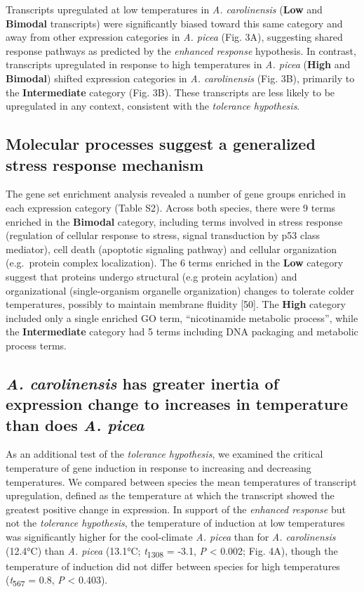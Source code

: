 \documentclass[]{article}
\begin{document}
Transcripts upregulated at low temperatures in \emph{A. carolinensis}
(\textbf{Low} and \textbf{Bimodal} transcripts) were significantly
biased toward this same category and away from other expression
categories in \emph{A. picea} (Fig. 3A), suggesting shared response
pathways as predicted by the \emph{enhanced response} hypothesis. In
contrast, transcripts upregulated in response to high temperatures in
\emph{A. picea} (\textbf{High} and \textbf{Bimodal}) shifted expression
categories in \emph{A. carolinensis} (Fig. 3B), primarily to the
\textbf{Intermediate} category (Fig. 3B). These transcripts are less
likely to be upregulated in any context, consistent with the
\emph{tolerance hypothesis}.

\subsection{Molecular processes suggest a generalized stress response
mechanism}\label{molecular-processes-suggest-a-generalized-stress-response-mechanism}

The gene set enrichment analysis revealed a number of gene groups
enriched in each expression category (Table S2). Across both species,
there were 9 terms enriched in the \textbf{Bimodal} category, including
terms involved in stress response (regulation of cellular response to
stress, signal transduction by p53 class mediator), cell death
(apoptotic signaling pathway) and cellular organization (e.g.~protein
complex localization). The 6 terms enriched in the \textbf{Low} category
suggest that proteins undergo structural (e.g protein acylation) and
organizational (single-organism organelle organization) changes to
tolerate colder temperatures, possibly to maintain membrane fluidity
{[}50{]}. The \textbf{High} category included only a single enriched GO
term, ``nicotinamide metabolic process'', while the
\textbf{Intermediate} category had 5 terms including DNA packaging and
metabolic process terms.

\subsection{\emph{A. carolinensis} has greater inertia of expression
change to increases in temperature than does \emph{A.
picea}}\label{a.-carolinensis-has-greater-inertia-of-expression-change-to-increases-in-temperature-than-does-a.-picea}

As an additional test of the \emph{tolerance hypothesis}, we examined
the critical temperature of gene induction in response to increasing and
decreasing temperatures. We compared between species the mean
temperatures of transcript upregulation, defined as the temperature at
which the transcript showed the greatest positive change in expression.
In support of the \emph{enhanced response} but not the \emph{tolerance
hypothesis}, the temperature of induction at low temperatures was
significantly higher for the cool-climate \emph{A. picea} than for
\emph{A. carolinensis} (12.4°C) than \emph{A. picea} (13.1°C;
\emph{t}\textsubscript{1308} = -3.1, \emph{P} \textless{} 0.002; Fig.
4A), though the temperature of induction did not differ between species
for high temperatures (\emph{t}\textsubscript{567} = 0.8, \emph{P}
\textless{} 0.403).
\end{document}
